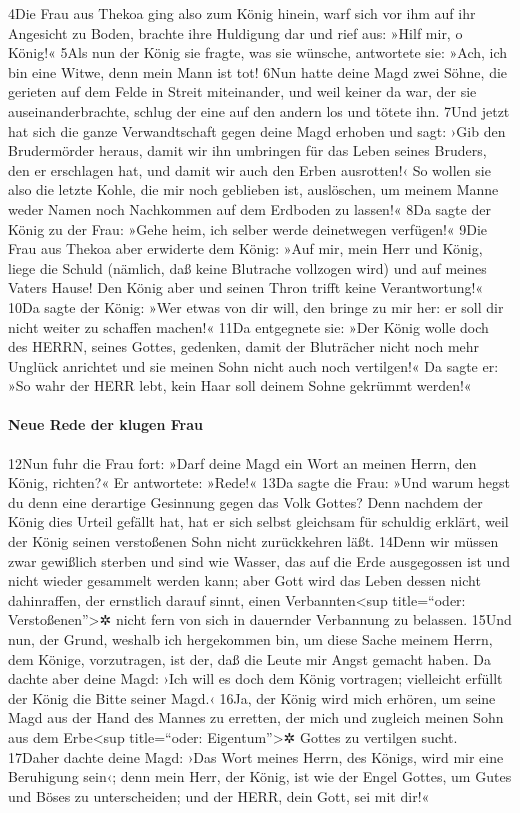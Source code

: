 4Die Frau aus Thekoa ging also zum König hinein, warf sich vor ihm auf
ihr Angesicht zu Boden, brachte ihre Huldigung dar und rief aus: »Hilf
mir, o König!« 5Als nun der König sie fragte, was sie wünsche,
antwortete sie: »Ach, ich bin eine Witwe, denn mein Mann ist tot! 6Nun
hatte deine Magd zwei Söhne, die gerieten auf dem Felde in Streit
miteinander, und weil keiner da war, der sie auseinanderbrachte, schlug
der eine auf den andern los und tötete ihn. 7Und jetzt hat sich die
ganze Verwandtschaft gegen deine Magd erhoben und sagt: ›Gib den
Brudermörder heraus, damit wir ihn umbringen für das Leben seines
Bruders, den er erschlagen hat, und damit wir auch den Erben ausrotten!‹
So wollen sie also die letzte Kohle, die mir noch geblieben ist,
auslöschen, um meinem Manne weder Namen noch Nachkommen auf dem Erdboden
zu lassen!« 8Da sagte der König zu der Frau: »Gehe heim, ich selber
werde deinetwegen verfügen!« 9Die Frau aus Thekoa aber erwiderte dem
König: »Auf mir, mein Herr und König, liege die Schuld (nämlich, daß
keine Blutrache vollzogen wird) und auf meines Vaters Hause! Den König
aber und seinen Thron trifft keine Verantwortung!« 10Da sagte der König:
»Wer etwas von dir will, den bringe zu mir her: er soll dir nicht weiter
zu schaffen machen!« 11Da entgegnete sie: »Der König wolle doch des
HERRN, seines Gottes, gedenken, damit der Bluträcher nicht noch mehr
Unglück anrichtet und sie meinen Sohn nicht auch noch vertilgen!« Da
sagte er: »So wahr der HERR lebt, kein Haar soll deinem Sohne gekrümmt
werden!«

\hypertarget{neue-rede-der-klugen-frau}{%
\paragraph{Neue Rede der klugen Frau}\label{neue-rede-der-klugen-frau}}

12Nun fuhr die Frau fort: »Darf deine Magd ein Wort an meinen Herrn, den
König, richten?« Er antwortete: »Rede!« 13Da sagte die Frau: »Und warum
hegst du denn eine derartige Gesinnung gegen das Volk Gottes? Denn
nachdem der König dies Urteil gefällt hat, hat er sich selbst gleichsam
für schuldig erklärt, weil der König seinen verstoßenen Sohn nicht
zurückkehren läßt. 14Denn wir müssen zwar gewißlich sterben und sind wie
Wasser, das auf die Erde ausgegossen ist und nicht wieder gesammelt
werden kann; aber Gott wird das Leben dessen nicht dahinraffen, der
ernstlich darauf sinnt, einen Verbannten\textless sup title=``oder:
Verstoßenen''\textgreater✲ nicht fern von sich in dauernder Verbannung
zu belassen. 15Und nun, der Grund, weshalb ich hergekommen bin, um diese
Sache meinem Herrn, dem Könige, vorzutragen, ist der, daß die Leute mir
Angst gemacht haben. Da dachte aber deine Magd: ›Ich will es doch dem
König vortragen; vielleicht erfüllt der König die Bitte seiner Magd.‹
16Ja, der König wird mich erhören, um seine Magd aus der Hand des Mannes
zu erretten, der mich und zugleich meinen Sohn aus dem Erbe\textless sup
title=``oder: Eigentum''\textgreater✲ Gottes zu vertilgen sucht. 17Daher
dachte deine Magd: ›Das Wort meines Herrn, des Königs, wird mir eine
Beruhigung sein‹; denn mein Herr, der König, ist wie der Engel Gottes,
um Gutes und Böses zu unterscheiden; und der HERR, dein Gott, sei mit
dir!«

